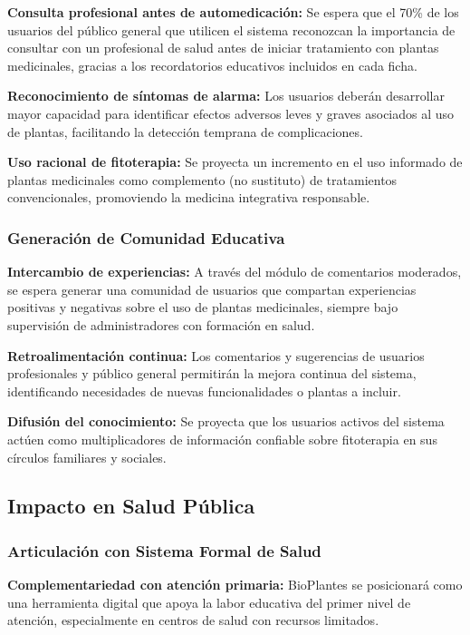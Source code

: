 \documentclass[12pt,a4paper]{article}
\begin{document}
\textbf{Consulta profesional antes de automedicación:} Se espera que el 70\% de los usuarios del público general que utilicen el sistema reconozcan la importancia de consultar con un profesional de salud antes de iniciar tratamiento con plantas medicinales, gracias a los recordatorios educativos incluidos en cada ficha.

\textbf{Reconocimiento de síntomas de alarma:} Los usuarios deberán desarrollar mayor capacidad para identificar efectos adversos leves y graves asociados al uso de plantas, facilitando la detección temprana de complicaciones.

\textbf{Uso racional de fitoterapia:} Se proyecta un incremento en el uso informado de plantas medicinales como complemento (no sustituto) de tratamientos convencionales, promoviendo la medicina integrativa responsable.

\subsubsection{Generación de Comunidad Educativa}

\textbf{Intercambio de experiencias:} A través del módulo de comentarios moderados, se espera generar una comunidad de usuarios que compartan experiencias positivas y negativas sobre el uso de plantas medicinales, siempre bajo supervisión de administradores con formación en salud.

\textbf{Retroalimentación continua:} Los comentarios y sugerencias de usuarios profesionales y público general permitirán la mejora continua del sistema, identificando necesidades de nuevas funcionalidades o plantas a incluir.

\textbf{Difusión del conocimiento:} Se proyecta que los usuarios activos del sistema actúen como multiplicadores de información confiable sobre fitoterapia en sus círculos familiares y sociales.

\subsection{Impacto en Salud Pública}

\subsubsection{Articulación con Sistema Formal de Salud}

\textbf{Complementariedad con atención primaria:} BioPlantes se posicionará como una herramienta digital que apoya la labor educativa del primer nivel de atención, especialmente en centros de salud con recursos limitados.
\end{document}
